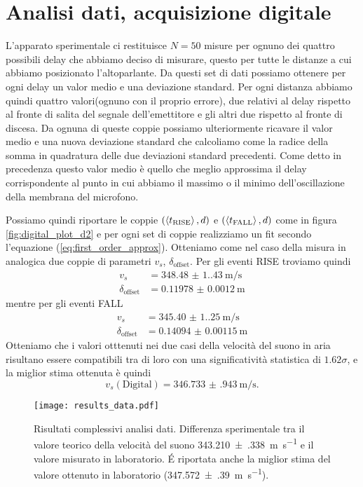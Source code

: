 \documentclass[
    rmp,
    reprint, 
    superscriptaddress, 
    altaffilletter, 
    amsmath, 
    amssymb, 
    a4paper,
    varvw]{revtex4-2}
\begin{document}
\section{Analisi dati, acquisizione digitale}

L'apparato sperimentale ci restituisce $N=50$ misure per ognuno dei quattro possibili delay che abbiamo deciso di misurare, questo per tutte le distanze a cui abbiamo posizionato l'altoparlante. Da questi set di dati possiamo ottenere per ogni delay un valor medio e una deviazione standard. Per ogni distanza abbiamo quindi quattro valori(ognuno con il proprio errore), due relativi al delay rispetto al fronte di salita del segnale dell'emettitore e gli altri due rispetto al fronte di discesa. Da ognuna di queste coppie possiamo ulteriormente ricavare il valor medio e una nuova deviazione standard che calcoliamo come la radice della somma in quadratura delle due deviazioni standard precedenti. Come detto in precedenza questo valor medio è quello che meglio approssima il delay corrispondente al punto in cui abbiamo il massimo o il minimo dell'oscillazione della membrana del microfono. 

Possiamo quindi riportare le coppie $(\expval{t_\text{RISE}}, d)$ e $(\expval{t_\text{FALL}}, d)$ come in figura \ref{fig:digital_plot_d2} e per ogni set di coppie realizziamo un fit secondo l'equazione (\ref{eq:first_order_approx}). Otteniamo come nel caso della misura in analogica due coppie di parametri $v_s$, $\delta_\text{offset}$.
Per gli eventi RISE troviamo quindi
\begin{align*}
    v_s &= \SI{348.48(1.43)}{\metre\per\second} \\
    \delta_\text{offset} &= \SI{0.11978(120)}{\metre}
\end{align*}
mentre per gli eventi FALL
\begin{align*}
    v_s &= \SI{345.40(1.25)}{\metre\per\second} \\
    \delta_\text{offset} &= \SI{0.14094(115)}{\metre}
\end{align*}
Otteniamo che i valori otttenuti nei due casi della velocità del suono in aria risultano essere compatibili tra di loro con una significatività statistica di $1.62\sigma$, e la miglior stima ottenuta è quindi \[v_s(\text{Digital}) = \SI{346.733(943)}{\metre\per\second}.\]


\begin{figure}
    \centering
    \texttt{[image: results\_data.pdf]}
    \caption{Risultati complessivi analisi dati. Differenza sperimentale tra il valore teorico della velocità del suono \SI{343.210(338)}{\metre\per\second} e il valore misurato in laboratorio. \'E riportata anche la miglior stima del valore ottenuto in laboratorio (\SI{347.572(390)}{\metre\per\second}).}\label{fig:results}
\end{figure}
\end{document}
